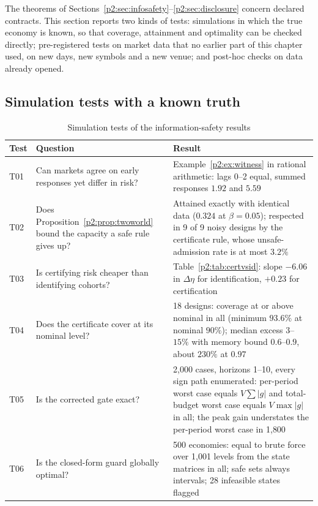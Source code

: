 The theorems of Sections~\ref{p2:sec:infosafety}--\ref{p2:sec:disclosure} concern declared contracts. This section reports two kinds of tests: simulations in which the true economy is known, so that coverage, attainment and optimality can be checked directly; pre-registered tests on market data that no earlier part of this chapter used, on new days, new symbols and a new venue; and post-hoc checks on data already opened.

\subsection{Simulation tests with a known truth}\label{p2:sec:simtests}

\begin{table}[!tbp]\centering\footnotesize
\begin{threeparttable}
\caption{Simulation tests of the information-safety results}\label{p2:tab:simtests}
\setlength{\tabcolsep}{3pt}
\begin{tabular}{p{}p{}p{}}
\toprule
Test & Question & Result\\
\midrule
T01 & Can markets agree on early responses yet differ in risk? & Example~\ref{p2:ex:witness} in rational arithmetic: lags 0--2 equal, summed responses $1.92$ and $5.59$\\
T02 & Does Proposition~\ref{p2:prop:twoworld} bound the capacity a safe rule gives up? & Attained exactly with identical data ($0.324$ at $\beta=0.05$); respected in 9 of 9 noisy designs by the certificate rule, whose unsafe-admission rate is at most $3.2\%$\\
T03 & Is certifying risk cheaper than identifying cohorts? & Table~\ref{p2:tab:certvsid}: slope $-6.06$ in $\Delta\eta$ for identification, $+0.23$ for certification\\
T04 & Does the certificate cover at its nominal level? & 18 designs: coverage at or above nominal in all (minimum $93.6\%$ at nominal $90\%$); median excess $3$--$15\%$ with memory bound $0.6$--$0.9$, about $230\%$ at $0.97$\\
T05 & Is the corrected gate exact? & 2{,}000 cases, horizons 1--10, every sign path enumerated: per-period worst case equals $V\sum|g|$ and total-budget worst case equals $V\max|g|$ in all; the peak gain understates the per-period worst case in 1{,}800\\
T06 & Is the closed-form guard globally optimal? & 500 economies: equal to brute force over 1{,}001 levels from the state matrices in all; safe sets always intervals; 28 infeasible states flagged\\

\end{tabular}
\end{threeparttable}
\end{table}
